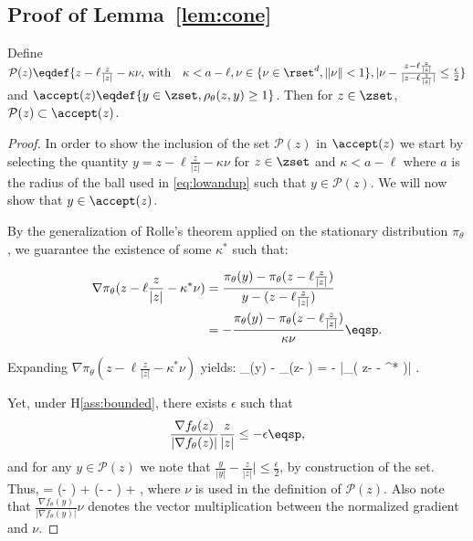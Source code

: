 \documentclass[10pt,twocolumn,letterpaper]{article}
\begin{document}
\subsection{Proof of Lemma~\ref{lem:cone}}

\begin{Lemma*}
Define $\mathcal{P}(z) \eqdef \{ z- \ell \frac{z}{|z|} - \kappa \nu , \, \textrm{with} \quad \kappa < a - \ell  , \nu \in \{ \nu \in \rset^d, \| \nu \| < 1\}, |\nu - \frac{z- \ell \frac{z}{|z|} }{|z- \ell \frac{z}{|z|} |} \leq \frac{\epsilon}{2}   \}$ and $\accept(z) \eqdef \{ y \in \zset, \rho_\theta(z,y) \geq 1 \}$. Then for $z \in \zset$, $\mathcal{P}(z) \subset \accept(z)$.
\end{Lemma*}

\begin{proof}

In order to show the inclusion of the set $\mathcal{P}(z)$ in $\accept(z)$ we start by selecting the quantity $y = z- \ell \frac{z}{|z|} - \kappa \nu$ for $z\in \zset$ and $\kappa < a - \ell $ where $a$ is the radius of the ball used in \eqref{eq:lowandup} such that $y \in \mathcal{P}(z)$.
We will now show that $y \in \accept(z)$.

By the generalization of Rolle's theorem applied on the stationary distribution $\pi_\theta$, we guarantee the existence of some $\kappa^*$ such that:

\begin{align}
\nabla \pi_\theta( z- \ell \frac{z}{|z|} - \kappa^* \nu) & = \frac{\pi_\theta(y) - \pi_\theta(z- \ell \frac{z}{|z|})}{y - (z- \ell \frac{z}{|z|})} \\
& = - \frac{\pi_\theta(y) - \pi_\theta(z- \ell \frac{z}{|z|})}{\kappa \nu} \eqsp.
\end{align}

Expanding $\nabla \pi_\theta( z- \ell \frac{z}{|z|} - \kappa^* \nu)$ yields:
\beq\label{eq:interlem}
\pi_\theta(y) - \pi_\theta(z- \ell {}) = - \kappa \nu {} |\nabla \pi_\theta( z- \ell {} - \kappa^* \nu)| \eqsp.
\eeq

Yet, under H\ref{ass:bounded}, there exists $\epsilon$ such that 
$$
 \frac{\nabla f_{\theta}(z) }{|\nabla f_{\theta}(z) |}  \frac{z }{|z|} \leq -\epsilon \eqsp,
 $$
 and for any $y \in \mathcal{P}(z)$ we note that $\frac{y }{|y|} - \frac{z }{|z|}|\leq \frac{\epsilon}{2}$, by construction of the set.
 Thus, 
\beq\label{eq:finallem}
    \nu  =   (\nu - ) +   (\nu -  -  ) +     \eqsp,
\eeq
 where $\nu$ is used in the definition of $\mathcal{P}(z)$.
 Also note that $  \frac{\nabla f_{\theta}(y) }{|\nabla f_{\theta}(y) |}  \nu  $ denotes the vector multiplication between the normalized gradient and $\nu$.
 

\end{proof}
\end{document}
